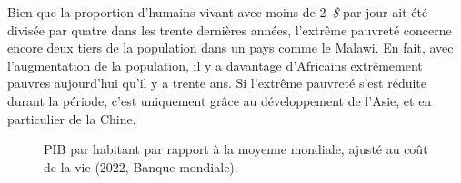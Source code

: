 \documentclass[a5paper,french,openany]{memoir}
\begin{document}
Bien que la proportion d'humains vivant avec moins de 2~\textit{\$} par jour ait été divisée par quatre dans les trente dernières années, l'extrême pauvreté concerne encore deux tiers de la population dans un pays comme le Malawi. En fait, avec l'augmentation de la population, il y a davantage d'Africains extrêmement pauvres aujourd'hui qu'il y a trente ans. Si l'extrême pauvreté s'est réduite durant la période, c'est uniquement grâce au développement de l'Asie, et en particulier de la Chine. %

\begin{figure}[h!] 
  \caption[Inégalités de PIB par habitant]{PIB par habitant par rapport à la moyenne mondiale, ajusté au coût de la vie (2022, Banque mondiale). %
  }\label{fig:GDPpc}
\end{figure}
\end{document}
